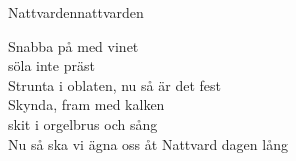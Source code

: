 \begin{song}{Nattvarden}{nattvarden}

\begin{vers}
Snabba på med vinet\\
söla inte präst\\
Strunta i oblaten, nu så är det fest\\
Skynda, fram med kalken\\
skit i orgelbrus och sång\\
Nu så ska vi ägna oss åt Nattvard dagen lång\\
\end{vers}
\end{song}
